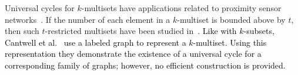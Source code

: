 \documentclass[US-letter,USenglish,authorcolumns,autoref]{lipics-v2021}
\newcommand{\red}[1] {\textcolor{red}{#1}}
\newcommand{\edit}[1]{\textcolor{black}{#1}}
\begin{document}

Universal cycles for $k$-multisets have applications related to proximity sensor networks~\cite{chen2024}.
If the number of each element in a $k$-multiset is bounded above by $t$, then such $t$-restricted multisets have been studied in~\cite{godbole2011}. 
\edit{Like with $k$-subsets, Cantwell et al.~\cite{cantwell} use a labeled graph to represent a $k$-multiset.  Using this representation they demonstrate the existence of a universal cycle for a corresponding family of graphs; however, no efficient construction is provided.}




%
%



\bigskip
\end{document}
